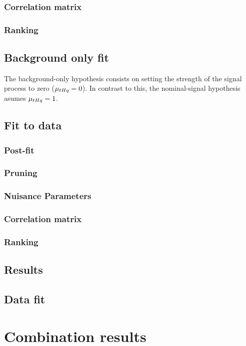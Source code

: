 \subsubsection{Correlation matrix}
\subsubsection{Ranking}

\subsection{Background only fit}
The background-only hypothesis consists on setting the strength of the signal process to zero ($\mu_{tHq}=0$). 
In contrast to this, the nominal-signal hypothesis asumes $\mu_{tHq}=1$. 



\subsection{Fit to data}
\subsubsection{Post-fit}
\subsubsection{Pruning}
\subsubsection{Nuisance Parameters}
\subsubsection{Correlation matrix}
\subsubsection{Ranking}
\subsection{Results}

\subsection{Data fit}


\section{Combination results}
\label{sec:ChaptH:Combination}


